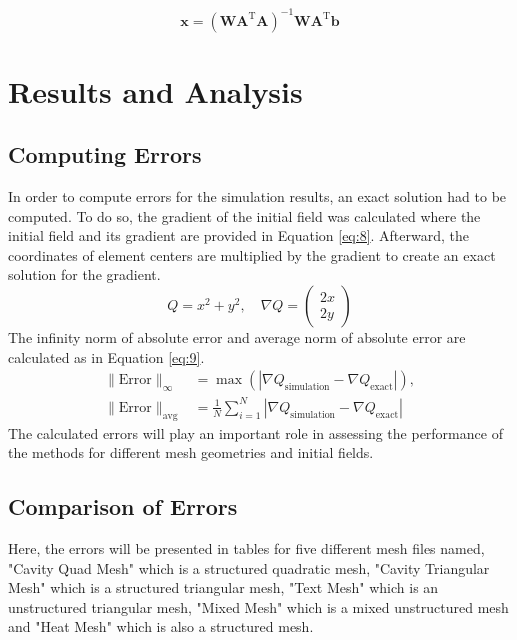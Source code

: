 \documentclass{article}
\begin{document}
\begin{equation}
\mathbf{x} = \left(\mathbf{W} \mathbf{A}^\mathrm{T} \mathbf{A} \right)^{-1} \mathbf{W}\mathbf{A}^\mathrm{T} \mathbf{b}
\label{eq:7}
\end{equation}


\section{Results and Analysis}
\label{Results and Analysis}
\subsection{Computing Errors}
In order to compute errors for the simulation results, an exact solution had to be computed. To do so, the gradient of the initial field was calculated where the initial field and its gradient are provided in Equation \ref{eq:8}. Afterward, the coordinates of element centers are multiplied by the gradient to create an exact solution for the gradient.
\begin{equation}
Q = x^2 + y^2, \quad \nabla Q = \begin{pmatrix} 2x \\ 2y \end{pmatrix}
\label{eq:8}
\end{equation}
The infinity norm of absolute error and average norm of absolute error are calculated as in Equation \ref{eq:9}.
\begin{equation}
\begin{aligned}
\| \text{Error} \|_{\infty} &= \max \left( \left| \nabla Q_{\text{simulation}} - \nabla Q_{\text{exact}} \right| \right), \\
\| \text{Error} \|_{\text{avg}} &= \frac{1}{N} \sum_{i=1}^{N} \left| \nabla Q_{\text{simulation}} - \nabla Q_{\text{exact}} \right|
\end{aligned}
\label{eq:9}
\end{equation}
The calculated errors will play an important role in assessing the performance of the methods for different mesh geometries and initial fields. 
\subsection{Comparison of Errors}
Here, the errors will be presented in tables for five different mesh files named, "Cavity Quad Mesh" which is a structured quadratic mesh, "Cavity Triangular Mesh" which is a structured triangular mesh, "Text Mesh" which is an unstructured triangular mesh,  "Mixed Mesh" which is a mixed unstructured mesh and "Heat Mesh" which is also a structured mesh.
\end{document}
